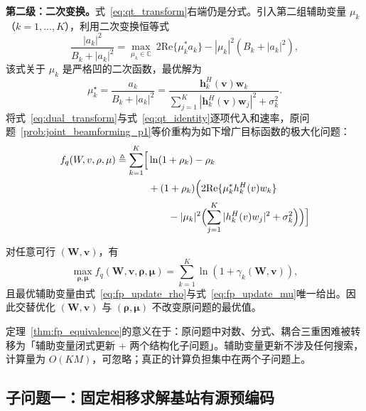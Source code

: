 \textbf{第二级：二次变换。}式~\eqref{eq:qt_transform}右端仍是分式。引入第二组辅助变量 $\mu_k$（$k = 1,\dots,K$），利用二次变换恒等式
\begin{equation}
  \frac{|a_k|^2}{B_k + |a_k|^2}
  = \max_{\mu_k \in \mathbb{C}}\ 2\mathrm{Re}\{\mu_k^* a_k\} - |\mu_k|^2\left(B_k + |a_k|^2\right),
  \label{eq:qt_identity}
\end{equation}
该式关于 $\mu_k$ 是严格凹的二次函数，最优解为
\begin{equation}
  \mu_k^{\star} = \frac{a_k}{B_k + |a_k|^2}
  = \frac{\bm{h}_k^H(\bm{v})\bm{w}_k}{\sum_{j=1}^{K}|\bm{h}_k^H(\bm{v})\bm{w}_j|^2 + \sigma_k^2}.
  \label{eq:fp_update_mu}
\end{equation}
将式~\eqref{eq:dual_transform}与式~\eqref{eq:qt_identity}逐项代入和速率，原问题~\eqref{prob:joint_beamforming_p1}等价重构为如下增广目标函数的极大化问题：
\begin{equation}
\begin{aligned}
  f_q(W, v, \rho, \mu) \triangleq \sum_{k=1}^K \Bigl[ &\ln(1 + \rho_k) - \rho_k \\
  &+ (1+\rho_k)\Bigl( 2\mathrm{Re}\{\mu_k^* h_k^H(v)w_k\} \\
  &\qquad - |\mu_k|^2 \Bigl( \sum_{j=1}^K |h_k^H(v)w_j|^2 + \sigma_k^2 \Bigr) \Bigr) \Bigr]
\end{aligned}
  \label{eq:fp_augmented_objective}
\end{equation}

\begin{theorem}[等价性]
\label{thm:fp_equivalence}
对任意可行 $(\bm{W}, \bm{v})$，有
\begin{equation}
  \max_{\bm{\rho},\bm{\mu}} f_q(\bm{W}, \bm{v}, \bm{\rho}, \bm{\mu}) = \sum_{k=1}^K \ln\left(1 + \gamma_k(\bm{W}, \bm{v})\right),
  \label{eq:fp_equivalence}
\end{equation}
且最优辅助变量由式~\eqref{eq:fp_update_rho}与式~\eqref{eq:fp_update_mu}唯一给出。因此交替优化 $(\bm{W},\bm{v})$ 与 $(\bm{\rho},\bm{\mu})$ 不改变原问题的最优值。
\end{theorem}

定理~\ref{thm:fp_equivalence}的意义在于：原问题中对数、分式、耦合三重困难被转移为「辅助变量闭式更新 + 两个结构化子问题」。辅助变量更新不涉及任何搜索，计算量为 $O(KM)$，可忽略；真正的计算负担集中在两个子问题上。

\subsection{子问题一：固定相移求解基站有源预编码}
\label{sec:sub_w}


